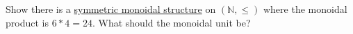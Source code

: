 Show there is a \href{doc/1 math/Seven Sketches in Compositionality/Chapter 2: Resource theories/2 Symmetric monoidal preorders/1 Definition and first examples/1 Symmetric monoidal structure on a preorder}{symmetric monoidal structure} on $(\mathbb{N}, \leq)$ where the monoidal product is $6*4=24$. What should the monoidal unit be?